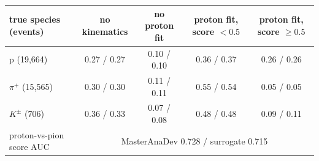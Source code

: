 \begin{tabular}{lcccc}
\toprule
true species (events) & no kinematics & no proton fit & proton fit, score $<0.5$ & proton fit, score $\geq 0.5$ \\
\midrule
p (19,664) & 0.27 / 0.27 & 0.10 / 0.10 & 0.36 / 0.37 & 0.26 / 0.26 \\
$\pi^+$ (15,565) & 0.30 / 0.30 & 0.11 / 0.11 & 0.55 / 0.54 & 0.05 / 0.05 \\
$K^\pm$ (706) & 0.36 / 0.33 & 0.07 / 0.08 & 0.48 / 0.48 & 0.09 / 0.11 \\
\midrule
proton-vs-pion score AUC & \multicolumn{4}{c}{MasterAnaDev 0.728 / surrogate 0.715} \\
\bottomrule
\end{tabular}
